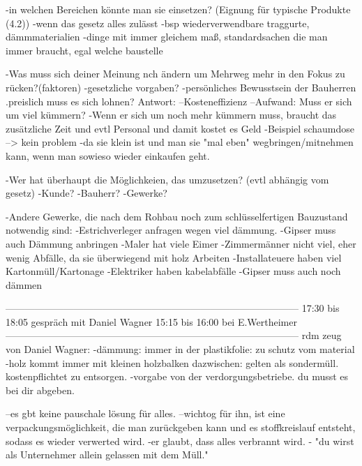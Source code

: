 -in welchen Bereichen könnte man sie einsetzen? (Eignung für typische Produkte (4.2))
        -wenn das gesetz alles zulässt
        -bsp wiederverwendbare traggurte, dämmmaterialien 
            -dinge mit immer gleichem maß, standardsachen die man immer braucht, egal welche baustelle

-Was muss sich deiner Meinung nch ändern um Mehrweg mehr in den Fokus zu rücken?(faktoren)
        -gesetzliche vorgaben?
        -persönliches Bewusstsein der Bauherren
        .preislich muss es sich lohnen?
    Antwort:
        --Kosteneffizienz
        --Aufwand: Muss er sich um viel kümmern? 
            -Wenn er sich um noch mehr kümmern muss, braucht das zusätzliche Zeit und evtl Personal und damit kostet es Geld
            -Beispiel schaumdose --> kein problem
                -da sie klein ist und man sie "mal eben" wegbringen/mitnehmen kann, wenn man sowieso wieder einkaufen geht.
    
        
-Wer hat überhaupt die Möglichkeien, das umzusetzen? (evtl abhängig vom gesetz)
        -Kunde?
        -Bauherr?
        -Gewerke?
        
-Andere Gewerke, die nach dem Rohbau noch zum schlüsselfertigen Bauzustand notwendig sind:
        -Estrichverleger anfragen wegen viel dämmung.
    -Gipser muss auch Dämmung anbringen
    -Maler hat viele Eimer
    -Zimmermänner nicht viel, eher wenig Abfälle, da sie überwiegend mit holz Arbeiten
    -Installateuere haben viel Kartonmüll/Kartonage
    -Elektriker haben kabelabfälle
    -Gipser muss auch noch dämmen

------------------------------------------------------------------------------------------
17:30 bis 18:05 gespräch mit Daniel Wagner
15:15 bis 16:00 bei E.Wertheimer
------------------------------------------------------------------------------------------
rdm zeug von Daniel Wagner:
     -dämmung: immer in der plastikfolie: zu schutz vom material
    -holz kommt immer mit kleinen holzbalken dazwischen: gelten als sondermüll. kostenpflichtet zu entsorgen.
        -vorgabe von der verdorgungsbetriebe. du musst es bei dir abgeben. 
    
            
          --es gbt keine pauschale lösung für alles.
          --wichtog für ihn, ist eine verpackungsmöglichkeit, die man zurückgeben kann und es stoffkreislauf entsteht, sodass es wieder verwerted wird.
                    -er glaubt, dass alles verbrannt wird.
                    - "du wirst als Unternehmer allein gelassen mit dem Müll."


